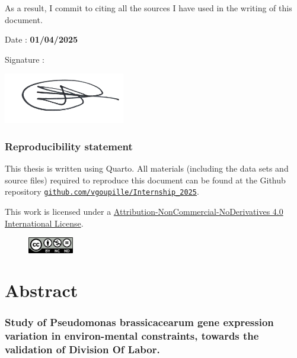 \documentclass[
  11pt,
  a4paper,
]{report}
\begin{document}
As a result, I commit to citing all the sources I have used in the
writing of this document.

Date : \textbf{01/04/2025}

Signature :

\includegraphics[width=2.08333in,height=\textheight,keepaspectratio]{figures/rapport/signature.png}

\subsection*{Reproducibility statement}\label{reproducibility-statement}

This thesis is written using Quarto. All materials (including the data
sets and source files) required to reproduce this document can be found
at the Github repository
\href{https://github.com/vgoupille/Internship_2025}{\texttt{github.com/vgoupille/Internship\_2025}}.

This work is licensed under a
\href{https://creativecommons.org/licenses/by-nc-nd/4.0/deed.en}{Attribution-NonCommercial-NoDerivatives
4.0 International License}.

\begin{figure}[h]
    \centering
    \includegraphics[width=75px]{figures/rapport/CC_BY-NC-ND.png}
\end{figure}


\chapter*{Abstract}\label{abstract}


\subsection*{Study of Pseudomonas brassicacearum gene expression
variation in environ-mental constraints, towards the validation of
Division Of
Labor.}\label{study-of-pseudomonas-brassicacearum-gene-expression-variation-in-environ-mental-constraints-towards-the-validation-of-division-of-labor.}
\end{document}
